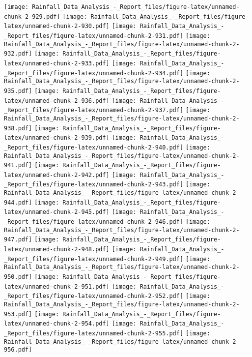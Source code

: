 \documentclass[
]{article}
\begin{document}
\texttt{[image: Rainfall\_Data\_Analysis\_-\_Report\_files/figure-latex/unnamed-chunk-2-929.pdf]}
\texttt{[image: Rainfall\_Data\_Analysis\_-\_Report\_files/figure-latex/unnamed-chunk-2-930.pdf]}
\texttt{[image: Rainfall\_Data\_Analysis\_-\_Report\_files/figure-latex/unnamed-chunk-2-931.pdf]}
\texttt{[image: Rainfall\_Data\_Analysis\_-\_Report\_files/figure-latex/unnamed-chunk-2-932.pdf]}
\texttt{[image: Rainfall\_Data\_Analysis\_-\_Report\_files/figure-latex/unnamed-chunk-2-933.pdf]}
\texttt{[image: Rainfall\_Data\_Analysis\_-\_Report\_files/figure-latex/unnamed-chunk-2-934.pdf]}
\texttt{[image: Rainfall\_Data\_Analysis\_-\_Report\_files/figure-latex/unnamed-chunk-2-935.pdf]}
\texttt{[image: Rainfall\_Data\_Analysis\_-\_Report\_files/figure-latex/unnamed-chunk-2-936.pdf]}
\texttt{[image: Rainfall\_Data\_Analysis\_-\_Report\_files/figure-latex/unnamed-chunk-2-937.pdf]}
\texttt{[image: Rainfall\_Data\_Analysis\_-\_Report\_files/figure-latex/unnamed-chunk-2-938.pdf]}
\texttt{[image: Rainfall\_Data\_Analysis\_-\_Report\_files/figure-latex/unnamed-chunk-2-939.pdf]}
\texttt{[image: Rainfall\_Data\_Analysis\_-\_Report\_files/figure-latex/unnamed-chunk-2-940.pdf]}
\texttt{[image: Rainfall\_Data\_Analysis\_-\_Report\_files/figure-latex/unnamed-chunk-2-941.pdf]}
\texttt{[image: Rainfall\_Data\_Analysis\_-\_Report\_files/figure-latex/unnamed-chunk-2-942.pdf]}
\texttt{[image: Rainfall\_Data\_Analysis\_-\_Report\_files/figure-latex/unnamed-chunk-2-943.pdf]}
\texttt{[image: Rainfall\_Data\_Analysis\_-\_Report\_files/figure-latex/unnamed-chunk-2-944.pdf]}
\texttt{[image: Rainfall\_Data\_Analysis\_-\_Report\_files/figure-latex/unnamed-chunk-2-945.pdf]}
\texttt{[image: Rainfall\_Data\_Analysis\_-\_Report\_files/figure-latex/unnamed-chunk-2-946.pdf]}
\texttt{[image: Rainfall\_Data\_Analysis\_-\_Report\_files/figure-latex/unnamed-chunk-2-947.pdf]}
\texttt{[image: Rainfall\_Data\_Analysis\_-\_Report\_files/figure-latex/unnamed-chunk-2-948.pdf]}
\texttt{[image: Rainfall\_Data\_Analysis\_-\_Report\_files/figure-latex/unnamed-chunk-2-949.pdf]}
\texttt{[image: Rainfall\_Data\_Analysis\_-\_Report\_files/figure-latex/unnamed-chunk-2-950.pdf]}
\texttt{[image: Rainfall\_Data\_Analysis\_-\_Report\_files/figure-latex/unnamed-chunk-2-951.pdf]}
\texttt{[image: Rainfall\_Data\_Analysis\_-\_Report\_files/figure-latex/unnamed-chunk-2-952.pdf]}
\texttt{[image: Rainfall\_Data\_Analysis\_-\_Report\_files/figure-latex/unnamed-chunk-2-953.pdf]}
\texttt{[image: Rainfall\_Data\_Analysis\_-\_Report\_files/figure-latex/unnamed-chunk-2-954.pdf]}
\texttt{[image: Rainfall\_Data\_Analysis\_-\_Report\_files/figure-latex/unnamed-chunk-2-955.pdf]}
\texttt{[image: Rainfall\_Data\_Analysis\_-\_Report\_files/figure-latex/unnamed-chunk-2-956.pdf]}
\end{document}
